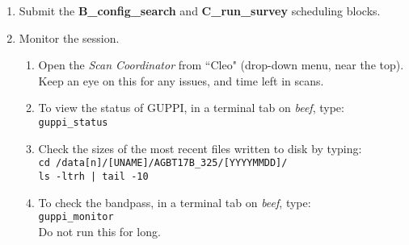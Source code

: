\documentclass[11pt]{article}
\begin{document}
\begin{enumerate}
 \item Submit the \textbf{B\_config\_search} and \textbf{C\_run\_survey} scheduling blocks. %
 \item Monitor the session. %
 \begin{enumerate}
  \item Open the \textit{Scan Coordinator} from ``Cleo" (drop-down menu, near the top).  Keep an eye on this for any issues, and time left in scans. %
  \item To view the status of GUPPI, in a terminal tab on \textit{beef}, type: \\ %
  \texttt{guppi\_status}
  \item\label{st:files} Check the sizes of the most recent files written to disk by typing: \\ %
  \texttt{cd /data[n]/[UNAME]/AGBT17B\_325/[YYYYMMDD]/ \\
  ls -ltrh | tail -10}
   \item To check the bandpass, in a terminal tab on \textit{beef}, type: \\ %
  \texttt{guppi\_monitor} \\
  Do not run this for long. 
 \end{enumerate}
\end{enumerate}

\end{document}
